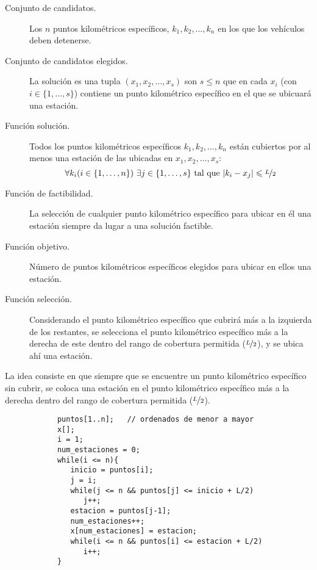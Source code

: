 \documentclass[12pt]{article}
\begin{document}
\begin{ejercicio}[2 puntos]
        \noindent
        \begin{description}
            \item [Conjunto de candidatos.] Los $n$ puntos kilométricos específicos, $k_1, k_2, \ldots, k_n$ en los que los vehículos deben detenerse.
            \item [Conjunto de candidatos elegidos.]  La solución es una tupla $(x_1, x_2, \ldots, x_s)$ son $s \leq n$ que en cada $x_i$ (con $i \in \{1,\ldots,s\}$) contiene un punto kilométrico específico en el que se ubicuará una estación.
            \item [Función solución.]  Todos los puntos kilométricos específicos $k_1,k_2, \ldots, k_n$ están cubiertos por al menos una estación de las ubicadas en $x_1, x_2, \ldots, x_s$:
                \begin{equation*}
                    \forall k_i (i \in \{1,\ldots,n\})~\exists j \in \{1,\ldots,s\} \text{\ tal que\ } |k_i - x_j| \leq \nicefrac{L}{2}
                \end{equation*}
            \item [Función de factibilidad.] La selección de cualquier punto kilométrico específico para ubicar en él una estación siempre da lugar a una solución factible.
            \item [Función objetivo.] Número de puntos kilométricos específicos elegidos para ubicar en ellos una estación.
            \item [Función selección.] Considerando el punto kilométrico específico que cubrirá más a la izquierda de los restantes, se selecciona el punto kilométrico específico más a la derecha de este dentro del rango de cobertura permitida ($\nicefrac{L}{2}$), y se ubica ahí una estación.
        \end{description}
        La idea consiste en que siempre que se encuentre un punto kilométrico específico sin cubrir, se coloca una estación en el punto kilométrico específico más a la derecha dentro del rango de cobertura permitida ($\nicefrac{L}{2}$).
        \begin{verbatim}
            puntos[1..n];   // ordenados de menor a mayor
            x[];
            i = 1;
            num_estaciones = 0;
            while(i <= n){
               inicio = puntos[i];
               j = i;
               while(j <= n && puntos[j] <= inicio + L/2)
                  j++;
               estacion = puntos[j-1];
               num_estaciones++;
               x[num_estaciones] = estacion;
               while(i <= n && puntos[i] <= estacion + L/2)
                  i++;
            }
        \end{verbatim}


\end{ejercicio}
\end{document}
